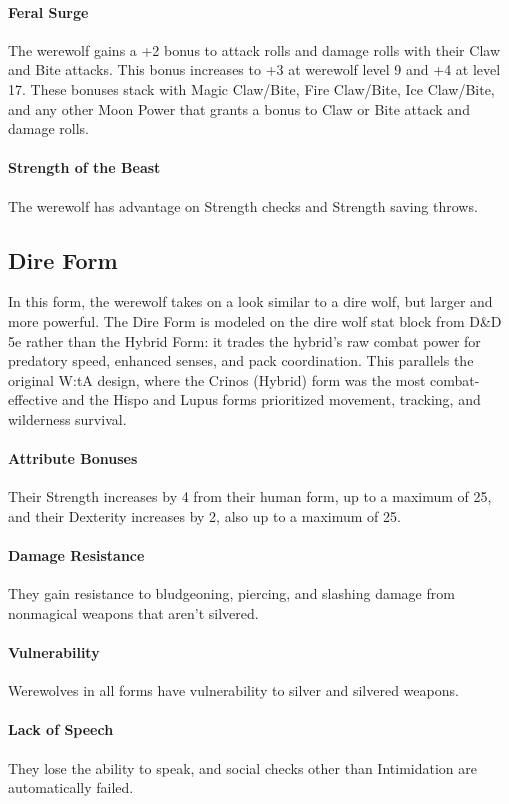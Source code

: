 \documentclass[twocolumn]{dndbook}
\begin{document}
\paragraph*{Feral Surge} The werewolf gains a +2 bonus to attack rolls and damage rolls with their Claw and Bite attacks. This bonus increases to +3 at werewolf level 9 and +4 at level 17.
These bonuses stack with Magic Claw/Bite, Fire Claw/Bite, Ice Claw/Bite, and any other Moon Power that grants a bonus to Claw or Bite attack and damage rolls.
\paragraph*{Strength of the Beast} The werewolf has advantage on Strength checks and Strength saving throws.

\subsection*{Dire Form}
In this form, the werewolf takes on a look similar to a dire wolf, but larger and more powerful.
The Dire Form is modeled on the dire wolf stat block from D\&D 5e rather than the Hybrid Form: it trades the hybrid's raw combat power for predatory speed, enhanced senses, and pack coordination.
This parallels the original W:tA design, where the Crinos (Hybrid) form was the most combat-effective and the Hispo and Lupus forms prioritized movement, tracking, and wilderness survival.
\paragraph*{Attribute Bonuses} Their Strength increases by 4 from their human form, up to a maximum of 25, and their Dexterity increases by 2, also up to a maximum of 25.
\paragraph*{Damage Resistance} They gain resistance to bludgeoning, piercing, and slashing damage from nonmagical weapons that aren't silvered.
\paragraph*{Vulnerability} Werewolves in all forms have vulnerability to silver and silvered weapons.
\paragraph*{Lack of Speech} They lose the ability to speak, and social checks other than Intimidation are automatically failed.
\end{document}
